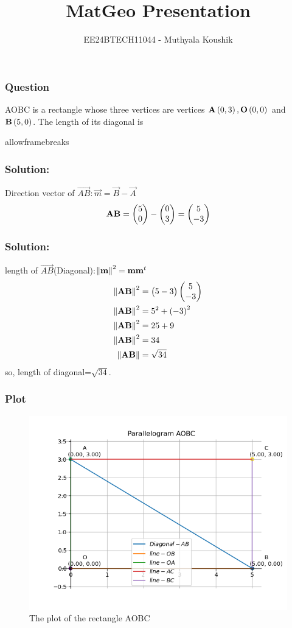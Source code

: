 \documentclass{beamer}
\begin{document}
\title{MatGeo Presentation}
\author{EE24BTECH11044 - Muthyala Koushik}
\date{}
\frame{\titlepage}

\begin{frame}
\frametitle{Question}
AOBC is a rectangle whose three vertices are vertices $\mathbf{A}\left(0,3\right), \mathbf{O}\left(0,0\right)$ and $\mathbf{B}\left(5,0\right)$. The length of its diagonal is
\end{frame}
\begin{frame}{allowframebreaks}
\frametitle{Solution:}
Direction vector of $\vec{AB}: \vec{m}=\vec{B}-\vec{A}$
           \begin{align}
		   \mathbf{AB}=\begin{pmatrix}5\\0\end{pmatrix}-\begin{pmatrix}0\\3\end{pmatrix}=\begin{pmatrix}5\\-3\end{pmatrix}
	   \end{align}	
\end{frame}
\begin{frame}
\frametitle{Solution:}

length of $\vec{AB}$(Diagonal):$\left\lVert\mathbf{m}\right\rVert^2=\mathbf{m}\mathbf{m}^t$
	   \begin{align}
		   \left\lVert\mathbf{AB}\right\rVert^2&=\begin{pmatrix}5 -3\end{pmatrix}\begin{pmatrix}5\\-3\end{pmatrix}\\
		      \left\lVert\mathbf{AB}\right\rVert^2&=5^2+\left(-3\right)^2\\
		       \left\lVert\mathbf{AB}\right\rVert^2&=25+9\\
		       \left\lVert\mathbf{AB}\right\rVert^2&=34\\
		   \left\lVert\mathbf{AB}\right\rVert&=\sqrt{34}
	   \end{align}
	   so, length of diagonal=$\sqrt{34}$.

\end{frame}
\begin{frame}
\frametitle{Plot}
\begin{figure}[h!]
	\centering
	\includegraphics[width=0.6\linewidth]{figs/fig-1.png}
	\caption{The plot of the rectangle AOBC}
\end{figure}
\end{frame}
\end{document}
